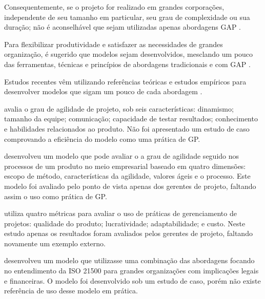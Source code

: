 Consequentemente, se o projeto for realizado em grandes corporações, independente de seu tamanho em particular, seu grau de complexidade ou sua duração; não é aconselhável que sejam utilizadas apenas abordagens GAP \cite{aguanno2004101, boehm2003using, boehm2004balancing, cockburn2000selecting, highsmith2009agile}.

Para flexibilizar produtividade e satisfazer as necessidades de grandes organização, é sugerido que modelos sejam desenvolvidos, mesclando um pouco das ferramentas, técnicas e princípios de abordagens tradicionais e com GAP \cite{batra2010balancing, barlow2011overview, boehm2004balancing, conforto2010evaluating, magdaleno2012reconciling}.

Estudos recentes vêm utilizando referências teóricas e estudos empíricos para desenvolver modelos que sigam um pouco de cada abordagem \cite{batra2010balancing, barlow2011overview, lindvall2004agile}.

 avalia o grau de agilidade de projeto, sob seis características: dinamismo; tamanho da equipe; comunicação; capacidade de testar resultados; conhecimento e habilidades relacionados ao produto. Não foi apresentado um estudo de caso comprovando a eficiência do modelo como uma prática de GP.

 desenvolveu um modelo que pode avaliar o a grau de agilidade seguido nos processos de um produto no meio empresarial baseado em quatro dimensões: escopo de método, características da agilidade, valores ágeis e o processo. Este modelo foi avaliado pelo ponto de vista apenas dos gerentes de projeto, faltando assim o uso como prática de GP.

 utiliza quatro métricas para avaliar o uso de práticas de gerenciamento de projetos: qualidade do produto; lucratividade; adaptabilidade; e custo. Neste estudo apenas os resultados foram avaliados pelos gerentes de projeto, faltando novamente um exemplo externo.

 desenvolveu um modelo que utilizasse uma combinação das abordagens focando no entendimento da ISO 21500 para grandes organizações com implicações legais e financeiras. O modelo foi desenvolvido sob um estudo de caso, porém não existe referência de uso desse modelo em prática.

